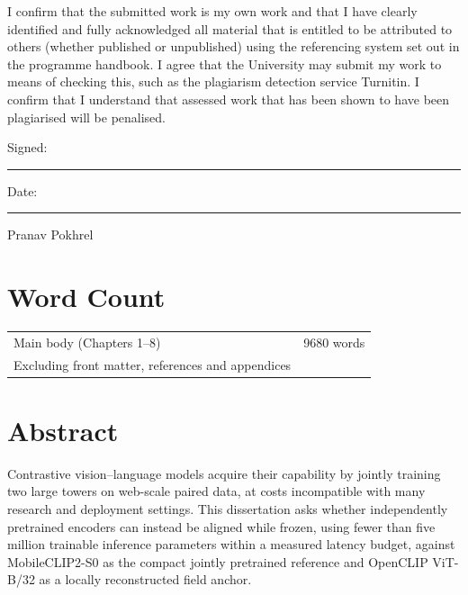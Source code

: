 \documentclass[11pt,a4paper,oneside]{report}
\begin{document}
I confirm that the submitted work is my own work and that I have clearly
identified and fully acknowledged all material that is entitled to be
attributed to others (whether published or unpublished) using the referencing
system set out in the programme handbook. I agree that the University may
submit my work to means of checking this, such as the plagiarism detection
service Turnitin\textregistered{}. I confirm that I understand that assessed
work that has been shown to have been plagiarised will be penalised.

\vspace{3\baselineskip}
\noindent Signed: \rule{6cm}{0.4pt}\hfill Date: \rule{4cm}{0.4pt}

\vspace{\baselineskip}
\noindent Pranav Pokhrel

\clearpage
\newpage
\chapter*{Word Count}

\begin{tabular}{ll}
\toprule
Main body (Chapters 1--8) & 9680 words \\
Excluding front matter, references and appendices & \\
\bottomrule
\end{tabular}

\clearpage
{}
\chapter*{Abstract}
Contrastive vision--language models acquire their capability by jointly training two large towers on web-scale paired data, at costs incompatible with many research and deployment settings. This dissertation asks whether independently pretrained encoders can instead be aligned while frozen, using fewer than five million trainable inference parameters within a measured latency budget, against MobileCLIP2-S0 as the compact jointly pretrained reference and OpenCLIP ViT-B/32 as a locally reconstructed field anchor.
\end{document}
